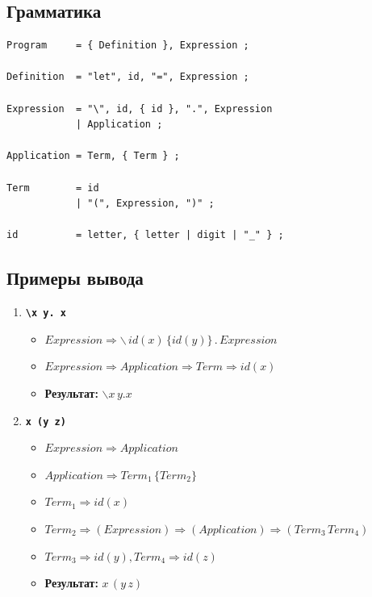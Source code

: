 \documentclass[11pt]{article}
\begin{document}
\subsection*{Грамматика}

\begin{verbatim}
Program     = { Definition }, Expression ;

Definition  = "let", id, "=", Expression ;

Expression  = "\", id, { id }, ".", Expression 
            | Application ;

Application = Term, { Term } ;

Term        = id 
            | "(", Expression, ")" ;

id          = letter, { letter | digit | "_" } ;
\end{verbatim}

\subsection*{Примеры вывода}

\begin{enumerate}
    \item \textbf{\texttt{\textbackslash x y. x}}
    \begin{itemize}
        \item $Expression \Rightarrow \backslash \, id(x) \, \{ id(y) \} \, . \, Expression$
        \item $Expression \Rightarrow Application \Rightarrow Term \Rightarrow id(x)$
        \item \textbf{Результат:} $\backslash x \, y . x$
    \end{itemize}

    \item \textbf{\texttt{x (y z)}}
    \begin{itemize}
        \item $Expression \Rightarrow Application$
        \item $Application \Rightarrow Term_1 \, \{ Term_2 \}$
        \item $Term_1 \Rightarrow id(x)$
        \item $Term_2 \Rightarrow ( Expression ) \Rightarrow ( Application ) \Rightarrow ( Term_3 \, Term_4 )$
        \item $Term_3 \Rightarrow id(y), Term_4 \Rightarrow id(z)$
        \item \textbf{Результат:} $x \, (y \, z)$
    \end{itemize}
\end{enumerate}
\end{document}
